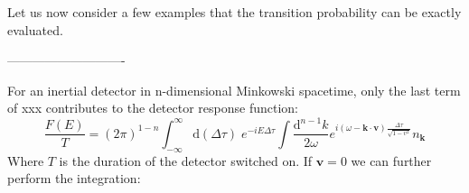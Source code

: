 \documentclass[12pt]{article}
\numberwithin{equation}{subsection}
\theoremstyle{mystyle}{\newtheorem{definition}{Definition}[subsection]}
\theoremstyle{mystyle}{\newtheorem{theorem}[definition]{Theorem}}
\theoremstyle{mystyle}{\newtheorem*{remark}{Remark}}
\theoremstyle{mystyle}{\newtheorem{example}{Example}[subsection]}
\theoremstyle{mystyle}{\newtheorem{examples}{Examples}[subsection]}
\theoremstyle{mystyle}{\newtheorem{cthm}{}[subsection]}
\newcommand{\id}{\mathrm{d}}
\begin{document}

Let us now consider a few examples that the transition probability can be exactly evaluated. 



----------------------------







For an inertial detector in n-dimensional Minkowski spacetime, only the last term of xxx contributes to the detector response function:
\begin{equation}
  \frac{F(E)}{T}=(2\pi)^{1-n}\int^{\infty}_{-\infty}\id (\Delta \tau)\;e^{-iE\Delta\tau}
  \int\frac{\id^{n-1}k}{2\omega}e^{i(\omega-\mathbf{k}\cdot\mathbf{v})\frac{\Delta\tau}{\sqrt{1-v^2}}}n_{\mathbf{k}}
\end{equation}
Where \(T\) is the duration of the detector switched on. If \(\mathbf{v}=0\) we can further perform the integration:
\end{document}
